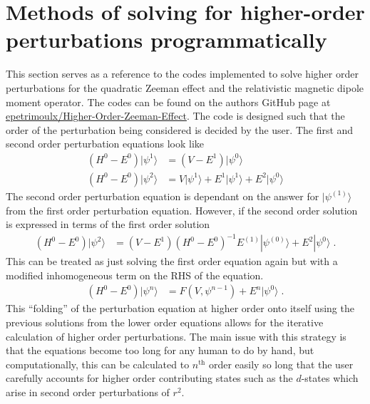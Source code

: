 \chapter{Methods of solving for higher-order perturbations programmatically} \label{sec:Program_perturbation}
    This section serves as a reference to the codes implemented to solve higher order perturbations for the quadratic Zeeman effect and the relativistic magnetic dipole moment operator. The codes can be found on the authors GitHub page at \href{https://github.com/epetrimoulx/Quadratic-Zeeman-Effect}{epetrimoulx/Higher-Order-Zeeman-Effect}. The code is designed such that the order of the perturbation being considered is decided by the user. The first and second order perturbation equations look like 
    \begin{align}
        \left( H^0 - E^0 \right) \vert \psi^{1}\rangle &= \left( V - E^{1}\right) \vert \psi^{0} \rangle \\
        \left( H^0 - E^0 \right) \vert \psi^{2}\rangle &= V \vert \psi^{1}\rangle + E^{1} \vert \psi^{1} \rangle + E^{2} \vert \psi^{0} \rangle
    \end{align}
    \noindent The second order perturbation equation is dependant on the answer for $\vert \psi^{(1)} \rangle$ from the first order perturbation equation. However, if the second order solution is expressed in terms of the first order solution
    \begin{align}
        \left( H^0 - E^0 \right) \vert \psi^{2}\rangle &= \left(V - E^{1}\right) (H^0 - E^0)^{-1} E^{(1)} |\psi^{(0)}\rangle + E^{2} |\psi^{0}\rangle\;.
    \end{align}
    \noindent This can be treated as just solving the first order equation again but with a modified inhomogeneous term on the RHS of the equation. 
    \begin{align}
        \left( H^0 - E^0 \right) \vert \psi^{n} \rangle &= F(V, \psi^{n-1}) + E^{n} \vert \psi^{0} \rangle\;.
    \end{align}
    \noindent This ``folding'' of the perturbation equation at higher order onto itself using the previous solutions from the lower order equations allows for the iterative calculation of higher order perturbations. The main issue with this strategy is that the equations become too long for any human to do by hand, but computationally, this can be calculated to $n^\text{th}$ order easily so long that the user carefully accounts for higher order contributing states such as the $d$-states which arise in second order perturbations of $r^2$. 


